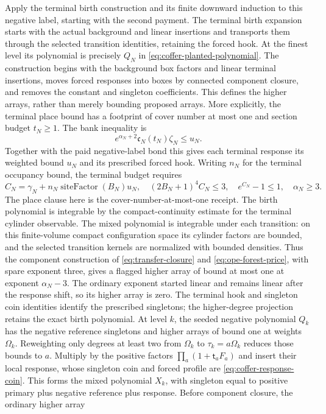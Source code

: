 Apply the terminal birth construction and its finite downward
induction to this negative label, starting with the second payment.
The terminal birth expansion starts with the actual background and
linear insertions and transports them through the selected transition
identities, retaining the forced hook. At the finest level its
polynomial is precisely $Q_N$ in
\eqref{eq:coffer-planted-polynomial}. The construction begins with the background box factors and linear
terminal insertions, moves forced responses into boxes by connected
component closure, and removes the constant and singleton
coefficients. This defines the higher arrays, rather than merely
bounding proposed arrays. More explicitly, the terminal place bound has a footprint of cover
number at most one and section budget $t_N\ge1$. The bank inequality is
\[
 e^{\alpha_N+2}\mathfrak c_N(t_N)\zeta_N\le u_N.
\]
Together with the paid negative-label bond this gives each terminal
response its weighted bound $u_N$ and its prescribed forced hook.
Writing $n_N$ for the terminal occupancy bound, the terminal budget
requires
\[
 C_N=\gamma_N+n_N\operatorname{siteFactor}(B_N)u_N,
 \quad (2B_N+1)^4C_N\le3,
 \quad e^{C_N}-1\le1,\quad \alpha_N\ge3.
\]
The place clause here is the cover-number-at-most-one receipt. The
birth polynomial is integrable by the compact-continuity estimate for
the terminal cylinder observable. The mixed polynomial is integrable under each transition: on this
finite-volume compact configuration space its cylinder factors are
bounded, and the selected transition kernels are normalized with
bounded densities.
Thus the component construction of \eqref{eq:transfer-closure} and
\eqref{eq:ope-forest-price}, with spare exponent three, gives a flagged
higher array of bound at most one at exponent $\alpha_N-3$.
The ordinary exponent started linear and remains linear after the
response shift, so its higher array is zero. The terminal hook and
singleton coin identities identify the prescribed singletons; the
higher-degree projection retains the exact birth polynomial.
At level $k$, the seeded negative polynomial $Q_k$ has the negative
reference singletons and higher arrays of bound one at weights
$\Omega_k$. Reweighting only degrees at least two from $\Omega_k$
to $\tau_k=a\Omega_k$ reduces those bounds to $a$. Multiply by the
positive factors $\prod_a(1+\mathsf t_aF_a)$ and insert their local
response, whose singleton coin and forced profile are
\eqref{eq:coffer-response-coin}. This forms the mixed polynomial
$X_k$, with singleton equal to positive primary plus negative reference
plus response. Before component closure, the ordinary higher array
